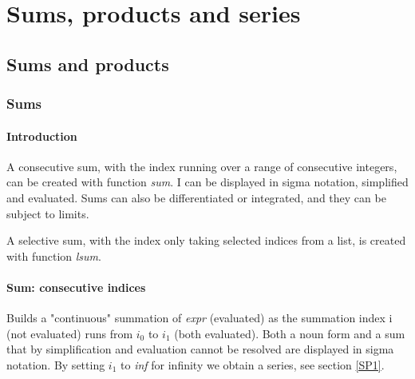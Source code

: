\documentclass[../Maxima_Workbook.tex]{subfiles}
\begin{document}
	
\chapter{Sums, products and series}

\section{Sums and products}

\subsection{Sums}

\subsubsection{Introduction}

A consecutive sum, with the index running over a range of consecutive integers, can be created with function \emph{sum}. I can be displayed in sigma notation, simplified and evaluated. Sums can also be differentiated or integrated, and they can be subject to limits.

\lz A selective sum, with the index only taking selected indices from a list, is created with function \emph{lsum}.


\subsubsection{Sum: consecutive indices} \mbox{}

\lzz {} \hfill \tcr{[function]}

\lz Builds a "continuous" summation of \emph{expr} (evaluated) as the summation index i (not evaluated) runs from $i_0$ to $i_1$ (both evaluated). Both a noun form and a sum that by simplification and evaluation cannot be resolved are displayed in sigma notation. By setting $ i_1 $ to \emph{inf} for infinity we obtain a series, see section \ref{SP1}.
\end{document}
